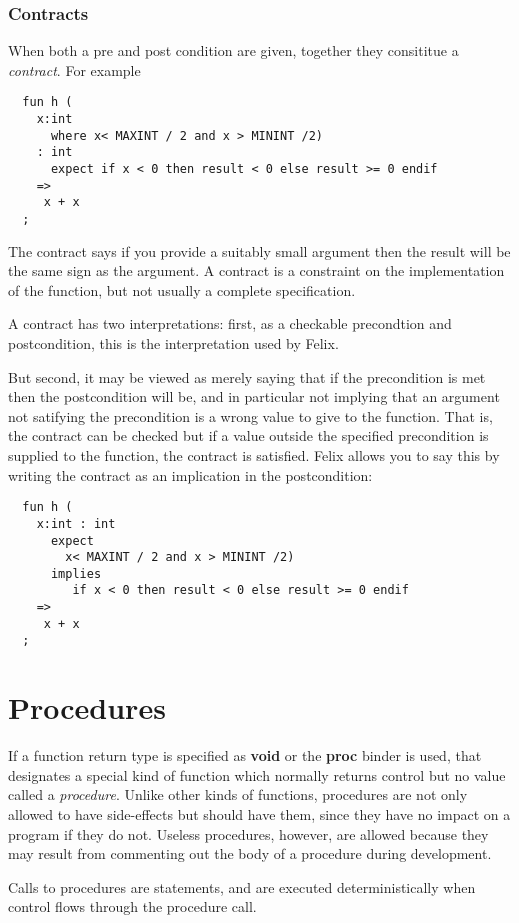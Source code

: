 \documentclass{article}
\begin{document}
\subsubsection{Contracts}
When both a pre and post condition are given,
together they consititue a {\em contract}. For example
\begin{verbatim}
  fun h (
    x:int 
      where x< MAXINT / 2 and x > MININT /2) 
    : int 
      expect if x < 0 then result < 0 else result >= 0 endif
    => 
     x + x
  ;
\end{verbatim}
The contract says if you provide a suitably small argument
then the result will be the same sign as the argument.
A contract is a constraint on the implementation of the
function, but not usually a complete specification.

A contract has two interpretations: first, as a checkable
precondtion and postcondition, this is the interpretation
used by Felix.

But second, it may be viewed as merely saying that if the precondition is
met then the postcondition will be, and in particular
not implying that an argument not satifying the precondition
is a wrong value to give to the function. That is, the
contract can be checked but if a value outside the specified
precondition is supplied to the function, the contract is
satisfied. Felix allows you to say this by writing the contract
as an implication in the postcondition:

\begin{verbatim}
  fun h (
    x:int : int 
      expect 
        x< MAXINT / 2 and x > MININT /2) 
      implies
         if x < 0 then result < 0 else result >= 0 endif
    => 
     x + x
  ;
\end{verbatim}

\section{Procedures}
If a function return type is specified as {\bf void} or
the {\bf proc} binder is used, that designates a special kind
of function which normally returns control but no value
called a {\em procedure}. Unlike other kinds of functions,
procedures are not only allowed to have side-effects but
should have them, since they have no impact on a program
if they do not. Useless procedures, however, are allowed
because they may result from commenting out the body
of a procedure during development.

Calls to procedures are statements, and are executed deterministically
when control flows through the procedure call.
\end{document}
